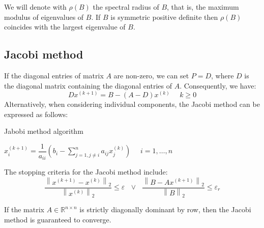 \documentclass[12pt, a4paper]{report}
\begin{document}
    We will denote with $\rho(B)$ the spectral radius of $B$, that is, the maximum modulus of eigenvalues of $B$. 
    If $B$ is symmetric positive definite then $\rho(B)$ coincides with the largest eigenvalue of $B$. 

    \subsection{Jacobi method}
    If the diagonal entries of matrix $A$ are non-zero, we can set $P=D$, where $D$ is the diagonal matrix containing the diagonal entries of $A$. 
    Consequently, we have:
    \[Dx^{(k+1)}=B-\left(A-D\right)x^{(k)} \:\:\:\:\:\: k \geq 0\]
    Alternatively, when considering individual components, the Jacobi method can be expressed as follows:
    \begin{algorithm}[H]
        \caption{Jabobi method algorithm}
            \begin{algorithmic}[1]
                \State $x_i^{(k+1)}=\dfrac{1}{a_{ii}}\left( b_i-\sum_{j=1,j \neq i}^{n}a_{ij}x_j^{(k)}\right) \:\:\:\:\:\: i=1,\dots,n $
            \end{algorithmic}
    \end{algorithm}
    The stopping criteria for the Jacobi method include:
    \[\dfrac{\left\lVert x^{(k+1)}-x^{(k)} \right\rVert_2}{\left\lVert x^{(k)} \right\rVert_2} \leq \varepsilon \:\:\: \lor \:\:\: \dfrac{\left\lVert B- Ax^{(k+1)} \right\rVert_2}{\left\lVert B \right\rVert_2} \leq \varepsilon_r\]
    \begin{proposition}
        If the matrix $A \in \mathbb{R}^{n \times n}$ is strictly diagonally dominant by row, then the Jacobi method is guaranteed to converge.
    \end{proposition}
\end{document}
